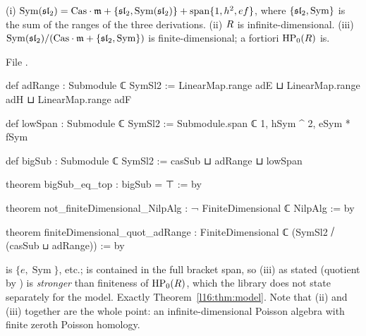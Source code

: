 \begin{theorem}\label{l16:thm:model}
(i) $\operatorname{Sym}(\mathfrak{sl}_2) = \mathrm{Cas}\cdot\mathfrak m + \{\mathfrak{sl}_2,\operatorname{Sym}(\mathfrak{sl}_2)\} +
\operatorname{span}\{1,h^2,ef\}$, where $\{\mathfrak{sl}_2,\operatorname{Sym}\}$ is the sum of the ranges of the three
derivations. (ii) $R$ is infinite-dimensional. (iii)
$\operatorname{Sym}(\mathfrak{sl}_2)/(\mathrm{Cas}\cdot\mathfrak m + \{\mathfrak{sl}_2,\operatorname{Sym}\})$ is finite-dimensional; a
fortiori $\mathrm{HP}_0(R)$ is.
\end{theorem}
\noindent File .
\begin{leancode}
def adRange : Submodule ℂ SymSl2 :=
  LinearMap.range adE ⊔ LinearMap.range adH ⊔ LinearMap.range adF

def lowSpan : Submodule ℂ SymSl2 := Submodule.span ℂ {1, hSym ^ 2, eSym * fSym}

def bigSub : Submodule ℂ SymSl2 := casSub ⊔ adRange ⊔ lowSpan

theorem bigSub_eq_top : bigSub = ⊤ := by

theorem not_finiteDimensional_NilpAlg : ¬ FiniteDimensional ℂ NilpAlg := by

theorem finiteDimensional_quot_adRange :
    FiniteDimensional ℂ (SymSl2 ⧸ (casSub ⊔ adRange)) := by
\end{leancode}

\begin{dictionary}
 is $\{e,\operatorname{Sym}\}$, etc.;  is contained in the full bracket span, so (iii)
as stated (quotient by ) is \emph{stronger} than finiteness of $\mathrm{HP}_0(R)$, which the
library does not state separately for the model. Exactly Theorem~\ref{l16:thm:model}. Note that (ii) and (iii) together
are the whole point: an infinite-dimensional Poisson algebra with finite zeroth Poisson homology.
\end{dictionary}

